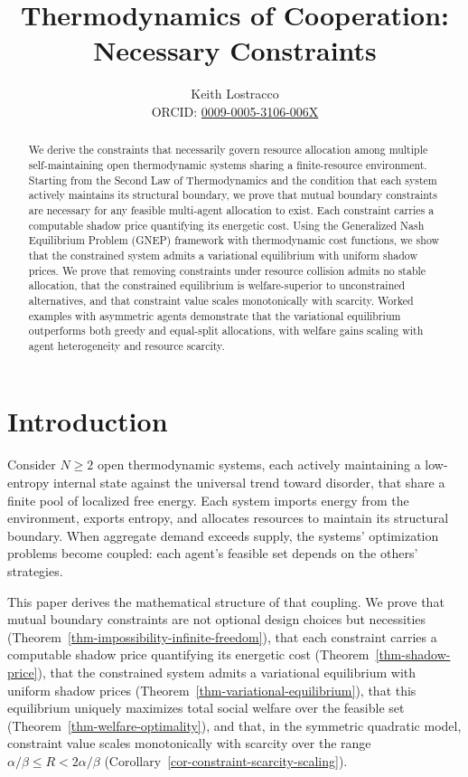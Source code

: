 \documentclass[11pt]{article}
\title{Thermodynamics of Cooperation: Necessary Constraints}
\author{%
Keith Lostracco%
\\[0.25em]{\normalsize ORCID: \href{https://orcid.org/0009-0005-3106-006X}{0009-0005-3106-006X}}%
}
\date{}
\theoremstyle{plain}
\theoremstyle{definition}
\theoremstyle{remark}
\let\origsection\section
\renewcommand{\section}{\needspace{12\baselineskip}\origsection}
\begin{document}
\maketitle

\begin{abstract}
We derive the constraints that necessarily govern resource allocation
among multiple self-maintaining open thermodynamic systems sharing a
finite-resource environment. Starting from the Second Law of
Thermodynamics and the condition that each system actively maintains its
structural boundary, we prove that mutual boundary constraints are
necessary for any feasible multi-agent allocation to exist. Each
constraint carries a computable shadow price quantifying its energetic
cost. Using the Generalized Nash Equilibrium Problem (GNEP) framework
with thermodynamic cost functions, we show that the constrained system
admits a variational equilibrium with uniform shadow prices. We prove
that removing constraints under resource collision admits no stable
allocation, that the constrained equilibrium is welfare-superior to
unconstrained alternatives, and that constraint value scales
monotonically with scarcity. Worked examples with asymmetric agents
demonstrate that the variational equilibrium outperforms both greedy and
equal-split allocations, with welfare gains scaling with agent
heterogeneity and resource scarcity.
\end{abstract}
\section{Introduction}\label{introduction}

Consider \(N \geq 2\) open thermodynamic systems, each actively
maintaining a low-entropy internal state against the universal trend
toward disorder, that share a finite pool of localized free energy. Each
system imports energy from the environment, exports entropy, and
allocates resources to maintain its structural boundary. When aggregate
demand exceeds supply, the systems' optimization problems become
coupled: each agent's feasible set depends on the others' strategies.

This paper derives the mathematical structure of that coupling. We prove
that mutual boundary constraints are not optional design choices but
necessities (Theorem~\ref{thm-impossibility-infinite-freedom}), that
each constraint carries a computable shadow price quantifying its
energetic cost (Theorem~\ref{thm-shadow-price}), that the constrained
system admits a variational equilibrium with uniform shadow prices
(Theorem~\ref{thm-variational-equilibrium}), that this equilibrium
uniquely maximizes total social welfare over the feasible set
(Theorem~\ref{thm-welfare-optimality}), and that, in the symmetric
quadratic model, constraint value scales monotonically with scarcity
over the range \(\alpha/\beta \leq R < 2\alpha/\beta\)
(Corollary~\ref{cor-constraint-scarcity-scaling}).
\end{document}

